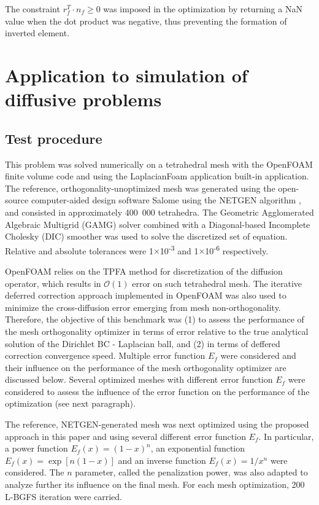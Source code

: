 \documentclass[11pt]{article}
\begin{document}
The constraint $r_f^T \cdot n_f \geq 0$ was imposed in the optimization by returning a NaN value when the dot product was negative, thus preventing the formation of inverted element.



\section{Application to simulation of diffusive problems}

\subsection{Test procedure}

This problem was solved numerically on a tetrahedral mesh with the OpenFOAM finite volume code \cite{} and using the LaplacianFoam application built-in application.
The reference, orthogonality-unoptimized mesh was generated using the open-source computer-aided design software Salome using the NETGEN algorithm \cite{schrobert_netgen}, and consisted in approximately 400~000 tetrahedra.
The Geometric Agglomerated Algebraic Multigrid (GAMG) solver combined with a Diagonal-based Incomplete Cholesky (DIC) smoother was used to solve the discretized set of equation. 
Relative and absolute tolerances were 1$\times$10\textsuperscript{-3} and 1$\times$10\textsuperscript{-6} respectively.

OpenFOAM relies on the TPFA method for discretization of the diffusion operator, which results in $\mathcal{O}(1)$ error on such tetrahedral mesh.
The iterative deferred correction approach implemented in OpenFOAM was also used to minimize the cross-diffusion error emerging from mesh non-orthogonality.
Therefore, the objective of this benchmark was (1) to assess the performance of the mesh orthogonality optimizer in terms of error relative to the true analytical solution of the Dirichlet BC - Laplacian ball, and (2) in terms of deffered correction convergence speed.
Multiple error function $E_f$ were considered and their influence on the performance of the mesh orthogonality optimizer are discussed below.
Several optimized meshes with different error function $E_f$ were considered to assess the influence of the error function on the performance of the optimization (see next paragraph).

The reference, NETGEN-generated mesh was next optimized using the proposed approach in this paper and using several different error function $E_f$.
In particular, a power function $E_f(x) = (1-x)^n$, an exponential function $E_f(x) = \exp \left[n(1-x) \right]$ and an inverse function $E_f(x) = 1/x^n$ were considered.
The $n$ parameter, called the penalization power, was also adapted to analyze further its influence on the final mesh.
For each mesh optimization, 200 L-BGFS iteration were carried.
\end{document}

